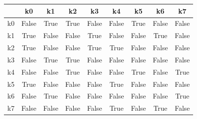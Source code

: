 \documentclass{article}
\begin{document}
\begin{center}
    \begin{tabular}{|c|c|c|c|c|c|c|c|c|}
        \hline 
            & k0 & k1 & k2 & k3 & k4 & k5 & k6 & k7  \\
        \hline 
        k0 & \color{red} False \color{black} & \color{green}True\color{black} & \color{green}True\color{black} & \color{red} False \color{black}&\color{red} False \color{black} & \color{green}True\color{black}& \color{red} False \color{black}& \color{red} False \color{black}\\
        \hline 
        k1 & \color{green}True\color{black} & \color{red} False \color{black}& \color{red} False \color{black}&\color{green}True\color{black} &\color{red} False \color{black} & \color{red} False \color{black}& \color{green}True\color{black}&\color{red} False \color{black}\\
        \hline 
        k2 &  \color{green}True\color{black} & \color{red} False \color{black}& \color{red} False \color{black}& \color{green}True\color{black}& \color{green}True\color{black}& \color{red} False \color{black}& \color{red} False \color{black}&\color{red} False \color{black}\\
        \hline 
        k3 & \color{red} False \color{black}&\color{green}True\color{black}  & \color{green}True\color{black}  & \color{red} False \color{black}& \color{red} False \color{black}& \color{red} False \color{black}& \color{red} False \color{black}&\color{red} False \color{black}\\
        \hline 
        k4 &\color{red} False \color{black} & \color{red} False \color{black}& \color{green}True\color{black} & \color{red} False \color{black}& \color{red} False \color{black}&\color{green}True\color{black} & \color{red} False \color{black}& \color{green}True\color{black}\\
        \hline 
        k5 & \color{green}True\color{black} & \color{red} False \color{black}& \color{red} False \color{black}&\color{red} False \color{black} & \color{green}True\color{black}  & \color{red} False \color{black}& \color{red} False \color{black}&\color{red} False \color{black}\\
        \hline 
        k6 &\color{red} False \color{black} & \color{green}True\color{black} & \color{red} False \color{black}& \color{red} False \color{black}& \color{red} False \color{black}& \color{red} False \color{black}&\color{red} False \color{black} & \color{green}True\color{black}\\
        \hline 
        k7 & \color{red} False \color{black}& \color{red} False \color{black}&\color{red} False \color{black} &\color{red} False \color{black} &\color{green}True\color{black}  & \color{red} False \color{black}& \color{green}True\color{black}  &\color{red} False \color{black}\\
        \hline 
    \end{tabular} 
    \end{center}
\end{document}
